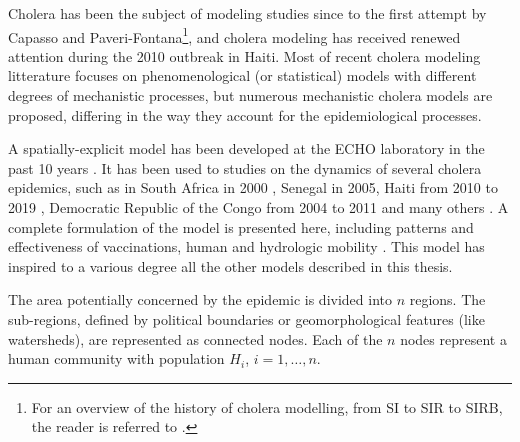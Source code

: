 Cholera has been the subject of modeling studies since to the first attempt by Capasso and Paveri-Fontana\cite[-4\baselineskip]{Capasso:MathematicalModel1973:1979}\footnote[][-1\baselineskip]{For an overview of the history of cholera modelling, from SI to SIR to SIRB, the reader is referred to .}, and cholera modeling has received renewed attention during the 2010 outbreak in Haiti. Most of recent cholera modeling litterature focuses on phenomenological (or statistical) models with different degrees of mechanistic processes, but numerous mechanistic cholera models are proposed, differing in the way they account for the epidemiological processes. %


A spatially-explicit model has been developed at the ECHO laboratory in the past 10 years \parencite{Bertuzzo:SpacetimeEvolutionCholera:2008}. It has been used to studies on the dynamics of several cholera epidemics, such as in South Africa in 2000 \parencite{Mari:ModellingCholeraEpidemics:2012}, Senegal in 2005, Haiti from 2010 to 2019 \parencite{Bertuzzo:PredictionSpatialEvolution:2011,Bertuzzo:ProbabilityExtinctionHaiti:2016}, Democratic Republic of the Congo from 2004 to 2011 and many others \parencite{Finger:PotentialImpactCasearea:2018}.  
A complete formulation of the model is presented here, including patterns and effectiveness of vaccinations, human and hydrologic mobility \parencite{Bertuzzo:ProbabilityExtinctionHaiti:2016,Pasetto:RealtimeForecastingCholera:2018}. This model has inspired to a various degree all the other models described in this thesis.

The area potentially concerned by the epidemic is divided into $n$ regions. The sub-regions, defined by political boundaries or geomorphological features (like watersheds\cite{Bertuzzo:ProbabilityExtinctionHaiti:2016}), are represented as connected nodes. Each of the $n$ nodes represent a human community with population $H_i$, $i=1,\dots, n$. 

